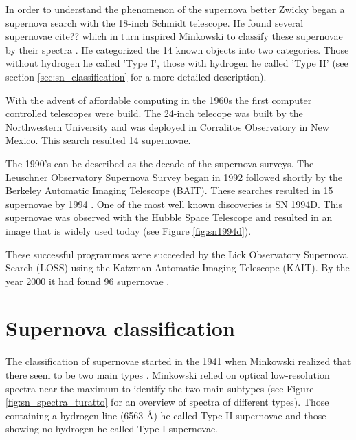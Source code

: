 In order to understand the phenomenon of the supernova better Zwicky began a supernova search with the 18-inch Schmidt telescope. He found several supernovae cite?? which in turn inspired Minkowski to classify these supernovae by their spectra \citet{1941PASP...53..224M}. 
He categorized the 14 known objects into two categories. Those without hydrogen he called 'Type I', those with hydrogen he called 'Type II' (see section \ref{sec:sn_classification} for a more detailed description).

With the advent of affordable computing in the 1960s the first computer controlled telescopes were build. The 24-inch telecope was built by the Northwestern University and was deployed in Corralitos Observatory in New Mexico. This search resulted 14 supernovae. 

The 1990's can be described as the decade of the supernova surveys. The Leuschner Observatory Supernova Survey began in 1992 followed shortly by the Berkeley Automatic Imaging Telescope (BAIT). These searches resulted in 15 supernovae by 1994 \citep{1994AAS...185.7905V}. One of the most well known discoveries is SN 1994D. This supernovae was observed with the Hubble Space Telescope and resulted in an image that is widely used today (see Figure \ref{fig:sn1994d}).

These successful programmes were succeeded by the Lick Observatory Supernova Search (LOSS) using the Katzman Automatic Imaging Telescope (KAIT). By the year 2000 it had found 96 supernovae \citep{2001ASPC..246..121F}.


\section{Supernova classification}

\label{sec:sn_classification}
The classification of supernovae started in the 1941 when Minkowski realized that there seem to be two main types \citep{1941PASP...53..224M}. Minkowski relied on optical low-resolution spectra near the maximum to identify the two main subtypes (see Figure \ref{fig:sn_spectra_turatto} for an overview of spectra of different types). Those containing a hydrogen line (6563 \AA) he called Type II supernovae and those showing no hydrogen he called Type I supernovae.  

